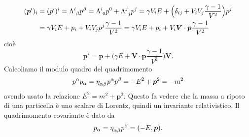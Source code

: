 \begin{equation}
  \begin{split}
    (\bm{p}')_{i} &= (p')^{i} = \tensor{\Lambda}{^{i}_{\beta}}p^{\beta} =
    \tensor{\Lambda}{^{i}_{0}}p^{0} + \tensor{\Lambda}{^{j}_{j}}p^{j} = \gamma
    V_{i}E + \Big( \delta_{ij} + V_{i}V_{j}\frac{\gamma-1}{V^{2}}\Big)p^{j} \\
    &= \gamma V_{i}E + p_{i} + V_{i}V_{j}p^{j}\frac{\gamma-1}{V^{2}} = \gamma
    V_{i}E + p_{i} + V_{i} \bm{V} \cdot \bm{p} \frac{\gamma-1}{V^{2}}
  \end{split}
\end{equation}
cioè
\begin{equation}
  \bm{p}' = \bm{p} + \Big(\gamma E + \bm{V} \cdot \bm{p}
  \frac{\gamma-1}{V^{2}}\Big)\bm{V}.
\end{equation}
Calcoliamo il modulo quadro del quadrimomento
\begin{equation}
  p^{\alpha}p_{\alpha} = \tensor{\eta}{_{\alpha\beta}}p^{\alpha}p^{\beta} =
  -E^{2} + \bm{p}^{2} = -m^{2}
\end{equation}
avendo usato la relazione $E^{2} = m^{2} + \bm{p}^{2}$.  Questo fa vedere che la
massa a riposo di una particella è uno scalare di Lorentz, quindi un invariante
relativistico.  Il quadrimomento covariante è dato da
\begin{equation}
  p_{\alpha} = \tensor{\eta}{_{\alpha\beta}}p^{\beta} = (-E, \bm{p}).
\end{equation}

